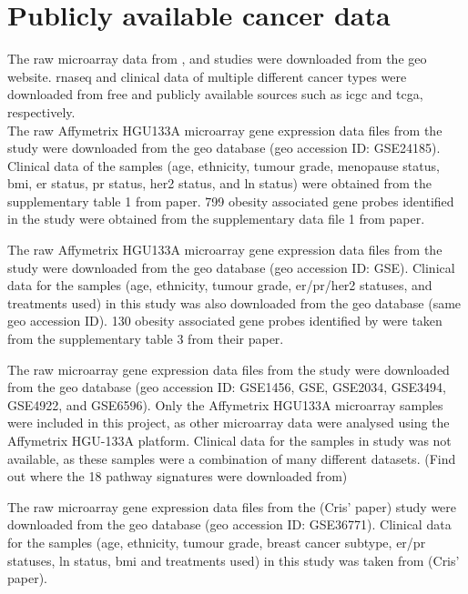 \section{Publicly available cancer data}
\label{sec:data}

The raw microarray data from \citet{Creighton2012}, \citet{Fuentes-Mattei2014} and \citet{Gatza2010a}  studies were downloaded from the \gls{geo} website.
\gls{rnaseq} and clinical data of multiple different cancer types were downloaded from free and publicly available sources such as \gls{icgc} and \gls{tcga}, respectively.
\\

\noindent
The raw Affymetrix HGU\-133A microarray gene expression data files from the \citet{Creighton2012} study were downloaded from the \gls{geo} database (\gls{geo} accession ID: GSE24185).
Clinical data of the samples (age, ethnicity, tumour grade, menopause status, \gls{bmi}, \gls{er} status, \gls{pr} status, \gls{her2} status, and \gls{ln} status) were obtained from the supplementary table 1 from \citet{Creighton2012} paper.
799 obesity associated gene probes identified in the \citet{Creighton2012} study were obtained from the supplementary data file 1 from \citet{Creighton2012} paper.

The raw Affymetrix HGU\-133A microarray gene expression data files from the  \citet{Fuentes-Mattei2014} study were downloaded from the \gls{geo} database (\gls{geo} accession ID: GSE).
Clinical data for the samples (age, ethnicity, tumour grade, \gls{er}/\gls{pr}/\gls{her2} statuses, and treatments used) in this study was also downloaded from the \gls{geo} database (same \gls{geo} accession ID).
130 obesity associated gene probes identified by \citet{Fuentes-Mattei2014} were taken from the supplementary table 3 from their paper.

The raw microarray gene expression data files from the \citet{Gatza2010a} study were downloaded from the \gls{geo} database (\gls{geo} accession ID: GSE1456, GSE, GSE2034, GSE3494, GSE4922, and GSE6596).
Only the Affymetrix HGU\-133A microarray samples were included in this project, as other microarray data were analysed using the Affymetrix HGU-133A platform.
Clinical data for the samples in \citet{Gatza2010a} study was not available, as these samples were a combination of many different datasets.
(Find out where the 18 pathway signatures were downloaded from)


The raw microarray gene expression data files from the (Cris' paper) study were downloaded from the \gls{geo} database (\gls{geo} accession ID: GSE36771).
Clinical data for the samples (age, ethnicity, tumour grade, breast cancer subtype, \gls{er}/\gls{pr} statuses, \gls{ln} status, \gls{bmi} and treatments used) in this study was taken from (Cris' paper).

